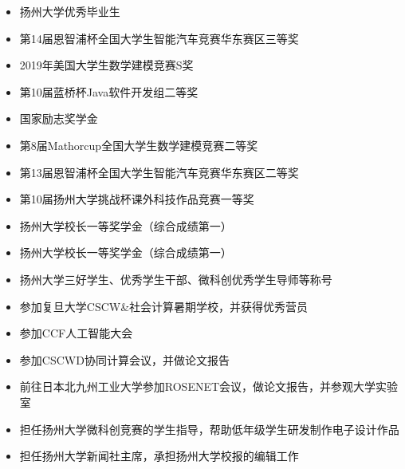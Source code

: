 \documentclass[zh]{resume}
\begin{document}
\begin{entries}
%
    {\begin{itemize}
      \item 扬州大学优秀毕业生
    \end{itemize}}
      \separator{0.3em}
    {\begin{itemize}
    \item 第14届恩智浦杯全国大学生智能汽车竞赛华东赛区三等奖
      \item 2019年美国大学生数学建模竞赛S奖
      \item 第10届蓝桥杯Java软件开发组二等奖
      \item 国家励志奖学金
    \end{itemize}}
      \separator{0.3em}
   {\begin{itemize}
      \item 第8届Mathorcup全国大学生数学建模竞赛二等奖
      \item 第13届恩智浦杯全国大学生智能汽车竞赛华东赛区二等奖
      \item 第10届扬州大学挑战杯课外科技作品竞赛一等奖
      \item 扬州大学校长一等奖学金（综合成绩第一）
    \end{itemize}}
      \separator{0.3em}
    {{\begin{itemize}
    \item  扬州大学校长一等奖学金（综合成绩第一）
      \item 扬州大学三好学生、优秀学生干部、微科创优秀学生导师等称号
    \end{itemize}}}
\end{entries}

\begin{entries}
    {\begin{itemize}
    \item 参加复旦大学CSCW\&社会计算暑期学校，并获得优秀营员
    \item 参加CCF人工智能大会
      \item 参加CSCWD协同计算会议，并做论文报告
    \end{itemize}}
      \separator{0.3em}
   {\begin{itemize}
      \item 前往日本\textbullet 北九州工业大学参加ROSENET会议，做论文报告，并参观大学实验室
      \item 担任扬州大学微科创竞赛的学生指导，帮助低年级学生研发制作电子设计作品
      \item 担任扬州大学新闻社主席，承担扬州大学校报的编辑工作
    \end{itemize}}
\end{entries}
\end{document}
